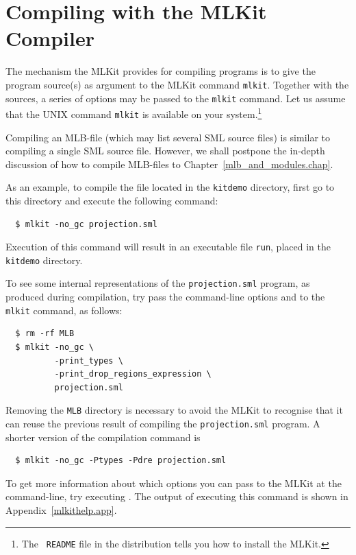 \documentclass[12pt]{book}
\begin{document}
\section{Compiling with the MLKit Compiler}

The mechanism the MLKit provides for compiling programs is to give the
program source(s) as argument to the MLKit command
%
\texttt{mlkit}.  Together with the sources, a series of options may be
passed to the \texttt{mlkit} command. Let us assume that the UNIX
command \texttt{mlkit} is available on your system.\footnote{The {\tt
    README} file in the distribution tells you how to install the
  MLKit.}

Compiling an
%
MLB-file (which may list several SML source files) is
similar to compiling a single SML source file. However, we shall
postpone the in-depth discussion of how to compile MLB-files to
Chapter~\ref{mlb_and_modules.chap}.

As an example, to compile the file  located in
the \texttt{kitdemo} directory, first go to this directory and execute
the following command:
\begin{verbatim}
  $ mlkit -no_gc projection.sml
\end{verbatim}
Execution of this command will result in an executable file
\texttt{run}, placed in the \texttt{kitdemo} directory.

To see some internal representations of the \texttt{projection.sml}
program, as produced during compilation, try pass the command-line
options  and
 to the \texttt{mlkit}
command, as follows:
\begin{verbatim}
  $ rm -rf MLB
  $ mlkit -no_gc \
          -print_types \
          -print_drop_regions_expression \
          projection.sml
\end{verbatim}
Removing the \texttt{MLB} directory is necessary to avoid the MLKit to
recognise that it can reuse the previous result of compiling the
\texttt{projection.sml} program.  A shorter version of the compilation
command is
\begin{verbatim}
  $ mlkit -no_gc -Ptypes -Pdre projection.sml
\end{verbatim}
To get more information about which options you can pass to the MLKit
at the command-line, try executing . The output of
executing this command is shown in Appendix~\ref{mlkithelp.app}.
\end{document}
